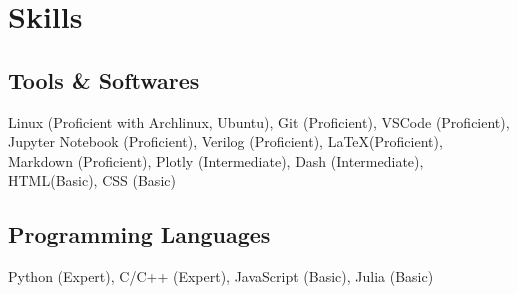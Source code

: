 \documentclass[]{resume}
\begin{document}
\begin{minipage}[t]{0.5\textwidth}
    \section{Skills}

    \subsection{Tools \& Softwares}
    Linux (Proficient with Archlinux, Ubuntu),
    Git (Proficient),
    VSCode (Proficient),
    Jupyter Notebook (Proficient),
    Verilog (Proficient),
    \LaTeX (Proficient),
    Markdown (Proficient),
    Plotly (Intermediate),
    Dash (Intermediate),
    HTML(Basic),
    CSS (Basic)\\

    \subsection{Programming Languages}
    Python (Expert), C/C++ (Expert), JavaScript (Basic), Julia (Basic)


\end{minipage}
\hfill
\end{document}
